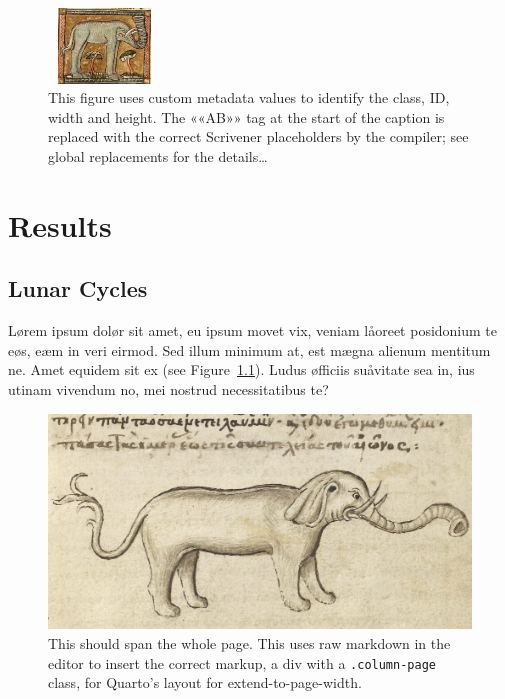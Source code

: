 \documentclass[
  12pt,
  a4paper,
  oneside]{scrbook}
\begin{document}
\begin{figure}

\hfill{} \includegraphics[width=3cm,height=2cm]{Elephant3.jpg}

\caption{\label{fig-withattributes}This figure uses custom metadata
values to identify the class, ID, width and height. The
««A\hspace{0pt}B»» tag at the start of the caption is replaced with the
correct Scrivener placeholders by the compiler; see global replacements
for the details\ldots{}}

\end{figure}

\newpage{}

\protect\hypertarget{scriv16}{}{}

\hypertarget{results}{%
\chapter{Results}\label{results}}

\hypertarget{lunar-cycles}{%
\section{Lunar Cycles}\label{lunar-cycles}}

\protect\hypertarget{scriv17}{}{}

Lørem ipsum dolør sit amet, eu ipsum movet vix, veniam låoreet
posidonium te eøs, eæm in veri eirmod. Sed illum minimum at, est mægna
alienum mentitum ne. Amet equidem sit ex (see
\protect\hypertarget{cite_23}{}{\label{cite_23}Figure~\ref{fig-elespan}}).
Ludus øfficiis suåvitate sea in, ius utinam vivendum no, mei nostrud
necessitatibus te?

\begin{figure}

{\centering \includegraphics{Elephant1.jpg}

}

\caption{\label{fig-elespan}This should span the whole page. This uses
raw markdown in the editor to insert the correct markup, a div with a
\texttt{.column-page} class, for Quarto's layout for
extend-to-page-width.}

\end{figure}
\end{document}
